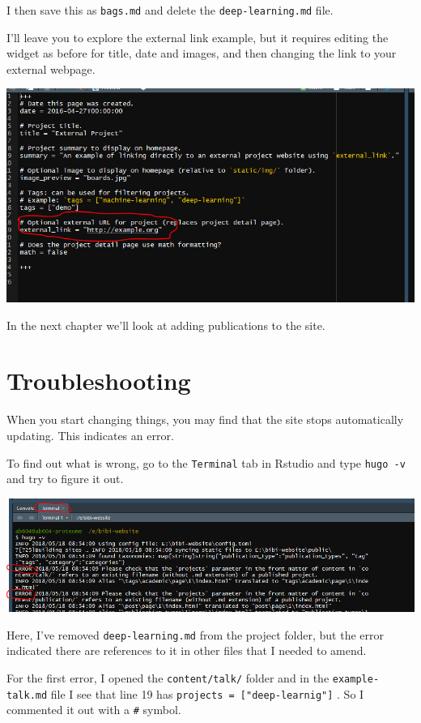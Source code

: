 \documentclass[12pt,]{book}
\theoremstyle{definition}
\theoremstyle{definition}
\theoremstyle{definition}
\theoremstyle{remark}
\begin{document}
I then save this as \texttt{bags.md} and delete the
\texttt{deep-learning.md} file.

I'll leave you to explore the external link example, but it requires
editing the widget as before for title, date and images, and then
changing the link to your external webpage.

\includegraphics[width=1.2\linewidth]{img/external-link-project}

In the next chapter we'll look at adding publications to the site.

\section{Troubleshooting}\label{troubleshooting}

When you start changing things, you may find that the site stops
automatically updating. This indicates an error.

To find out what is wrong, go to the \texttt{Terminal} tab in Rstudio
and type \texttt{hugo\ -v} and try to figure it out.

\includegraphics[width=1.2\linewidth]{img/hugo-error}

Here, I've removed \texttt{deep-learning.md} from the project folder,
but the error indicated there are references to it in other files that I
needed to amend.

For the first error, I opened the \texttt{content/talk/} folder and in
the \texttt{example-talk.md} file I see that line 19 has
\texttt{projects\ =\ {[}"deep-learnig"{]}} . So I commented it out with
a \texttt{\#} symbol.
\end{document}
